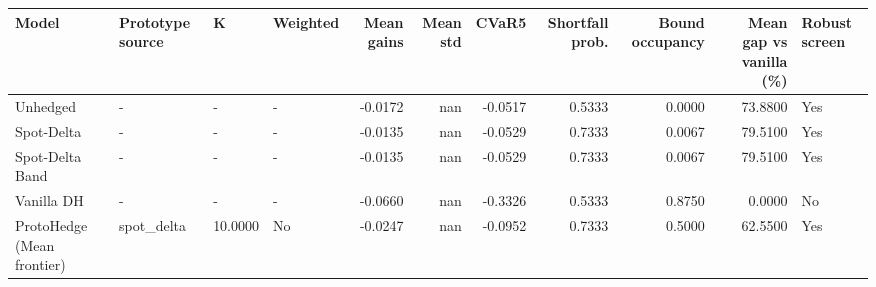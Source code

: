 \begin{tabular}{llllrrrrrrl}
\toprule
Model & Prototype source & K & Weighted & Mean gains & Mean std & CVaR5 & Shortfall prob. & Bound occupancy & Mean gap vs vanilla (\%) & Robust screen \\
\midrule
Unhedged & - & - & - & -0.0172 & nan & -0.0517 & 0.5333 & 0.0000 & 73.8800 & Yes \\
Spot-Delta & - & - & - & -0.0135 & nan & -0.0529 & 0.7333 & 0.0067 & 79.5100 & Yes \\
Spot-Delta Band & - & - & - & -0.0135 & nan & -0.0529 & 0.7333 & 0.0067 & 79.5100 & Yes \\
Vanilla DH & - & - & - & -0.0660 & nan & -0.3326 & 0.5333 & 0.8750 & 0.0000 & No \\
ProtoHedge (Mean frontier) & spot\_delta & 10.0000 & No & -0.0247 & nan & -0.0952 & 0.7333 & 0.5000 & 62.5500 & Yes \\
\bottomrule
\end{tabular}